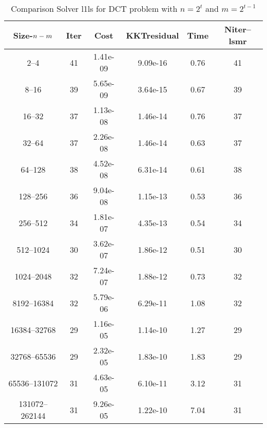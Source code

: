 \documentclass[letterpaper,12pt,oneside,final]{book}
\begin{document}
\begin{table}
\caption{Comparison Solver  l1ls  for  DCT problem with $n=2^{t}$ and $m=2^{t-1}$} 
\begin{center}
\begin{tabular}{|*{6}{c}|} \hline
Size-$n\--m$ & \multicolumn{1}{c}{Iter} & \multicolumn{1}{c}{Cost}& \multicolumn{1}{c}{KKTresidual} & \multicolumn{1}{c}{Time} & \multicolumn{1}{c|}{Niter--lsmr} \\ 
\hline
2--4    &41    &1.41e-09    &9.09e-16    &0.76    &41 \\
8--16    &39    &5.65e-09    &3.64e-15    &0.67    &39  \\
16--32    &37    &1.13e-08    &1.46e-14    &0.76    &37  \\
32--64    &37    &2.26e-08    &1.46e-14    &0.63    &37  \\
64--128    &38    &4.52e-08    &6.31e-14    &0.61    &38  \\
128--256    &36    &9.04e-08    &1.15e-13    &0.53    &36  \\
256--512    &34    &1.81e-07    &4.35e-13    &0.54    &34  \\
512--1024    &30    &3.62e-07    &1.86e-12    &0.51    &30  \\
1024--2048    &32    &7.24e-07    &1.88e-12    &0.73    &32  \\
8192--16384    &32    &5.79e-06    &6.29e-11    &1.08    &32  \\
16384--32768    &29    &1.16e-05    &1.14e-10    &1.27    &29  \\
32768--65536    &29    &2.32e-05    &1.83e-10    &1.83    &29  \\
65536--131072    &31    &4.63e-05    &6.10e-11    &3.12    &31  \\
131072--262144    &31    &9.26e-05    &1.22e-10    &7.04    &31  \\

\hline
\end{tabular}
\end{center}
\end{table}
\end{document}
